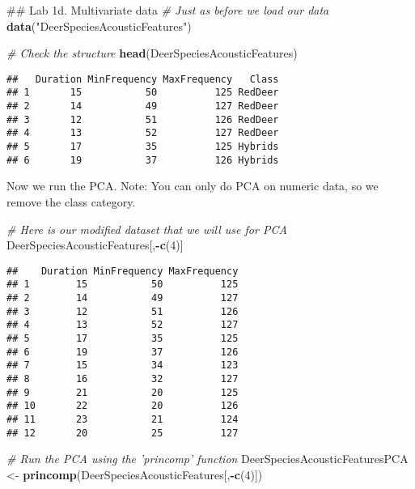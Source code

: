 \documentclass[]{book}
\newenvironment{Shaded}{\begin{snugshade}}{\end{snugshade}}
\newcommand{\CommentTok}[1]{\textcolor[rgb]{0.56,0.35,0.01}{\textit{#1}}}
\newcommand{\DecValTok}[1]{\textcolor[rgb]{0.00,0.00,0.81}{#1}}
\newcommand{\KeywordTok}[1]{\textcolor[rgb]{0.13,0.29,0.53}{\textbf{#1}}}
\newcommand{\NormalTok}[1]{#1}
\newcommand{\OperatorTok}[1]{\textcolor[rgb]{0.81,0.36,0.00}{\textbf{#1}}}
\newcommand{\StringTok}[1]{\textcolor[rgb]{0.31,0.60,0.02}{#1}}
\begin{document}
\begin{Shaded}
\begin{Highlighting}[]
\NormalTok{## Lab 1d. Multivariate data}
\CommentTok{# Just as before we load our data}
\KeywordTok{data}\NormalTok{(}\StringTok{"DeerSpeciesAcousticFeatures"}\NormalTok{)}

\CommentTok{# Check the structure}
\KeywordTok{head}\NormalTok{(DeerSpeciesAcousticFeatures)}
\end{Highlighting}
\end{Shaded}

\begin{verbatim}
##   Duration MinFrequency MaxFrequency   Class
## 1       15           50          125 RedDeer
## 2       14           49          127 RedDeer
## 3       12           51          126 RedDeer
## 4       13           52          127 RedDeer
## 5       17           35          125 Hybrids
## 6       19           37          126 Hybrids
\end{verbatim}

Now we run the PCA. Note: You can only do PCA on numeric data, so we remove the class category.

\begin{Shaded}
\begin{Highlighting}[]
\CommentTok{# Here is our modified dataset that we will use for PCA}
\NormalTok{DeerSpeciesAcousticFeatures[,}\OperatorTok{-}\KeywordTok{c}\NormalTok{(}\DecValTok{4}\NormalTok{)] }
\end{Highlighting}
\end{Shaded}

\begin{verbatim}
##    Duration MinFrequency MaxFrequency
## 1        15           50          125
## 2        14           49          127
## 3        12           51          126
## 4        13           52          127
## 5        17           35          125
## 6        19           37          126
## 7        15           34          123
## 8        16           32          127
## 9        21           20          125
## 10       22           20          126
## 11       23           21          124
## 12       20           25          127
\end{verbatim}

\begin{Shaded}
\begin{Highlighting}[]
\CommentTok{# Run the PCA using the 'princomp' function}
\NormalTok{DeerSpeciesAcousticFeaturesPCA <-}\StringTok{ }\KeywordTok{princomp}\NormalTok{(DeerSpeciesAcousticFeatures[,}\OperatorTok{-}\KeywordTok{c}\NormalTok{(}\DecValTok{4}\NormalTok{)])}
\end{Highlighting}
\end{Shaded}
\end{document}
